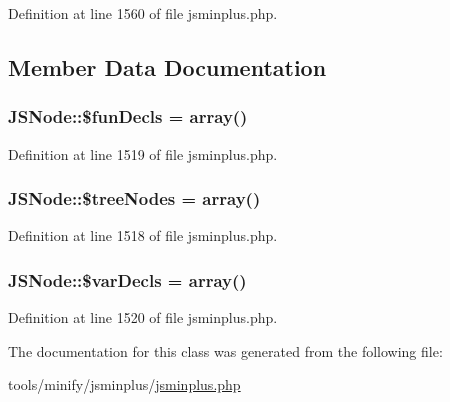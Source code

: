 Definition at line 1560 of file jsminplus.\+php.



\subsection{Member Data Documentation}
\hypertarget{classJSNode_a80ebcf10066c08ef99f439d572a4b740}{
\subsubsection[{\$fun\+Decls}]{\setlength{\rightskip}{0pt plus 5cm}J\+S\+Node\+::\$fun\+Decls = array()}}\label{classJSNode_a80ebcf10066c08ef99f439d572a4b740}


Definition at line 1519 of file jsminplus.\+php.

\hypertarget{classJSNode_acee64a4122d061908ec363325b85c2a1}{
\subsubsection[{\$tree\+Nodes}]{\setlength{\rightskip}{0pt plus 5cm}J\+S\+Node\+::\$tree\+Nodes = array()}}\label{classJSNode_acee64a4122d061908ec363325b85c2a1}


Definition at line 1518 of file jsminplus.\+php.

\hypertarget{classJSNode_ae7e70231a4a0459b23ed923078ed0213}{
\subsubsection[{\$var\+Decls}]{\setlength{\rightskip}{0pt plus 5cm}J\+S\+Node\+::\$var\+Decls = array()}}\label{classJSNode_ae7e70231a4a0459b23ed923078ed0213}


Definition at line 1520 of file jsminplus.\+php.



The documentation for this class was generated from the following file\+:\begin{DoxyCompactItemize}
\item 
tools/minify/jsminplus/\hyperlink{jsminplus_8php}{jsminplus.\+php}\end{DoxyCompactItemize}
